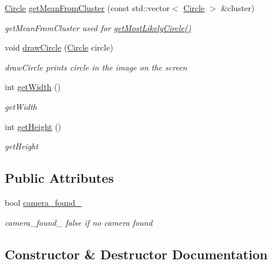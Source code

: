\begin{DoxyCompactItemize}
\hyperlink{struct_circle}{Circle} \hyperlink{class_find_ball_af7bd59a7915e09c1b6f004c89e2831c7}{get\+Mean\+From\+Cluster} (const std\+::vector$<$ \hyperlink{struct_circle}{Circle} $>$ \&cluster)
\begin{DoxyCompactList}\small\item\em get\+Mean\+From\+Cluster used for \hyperlink{class_find_ball_a11094b7b426f6c92281b3c86c04fe0ca}{get\+Most\+Likely\+Circle()} \end{DoxyCompactList}\item 
void \hyperlink{class_find_ball_ace38a252ba082f0e71fb71ad3519be6b}{draw\+Circle} (\hyperlink{struct_circle}{Circle} circle)
\begin{DoxyCompactList}\small\item\em draw\+Circle prints circle in the image on the screen \end{DoxyCompactList}\item 
int \hyperlink{class_find_ball_a1daa192fbb6dfd79d5ff6a05b5be737d}{get\+Width} ()
\begin{DoxyCompactList}\small\item\em get\+Width \end{DoxyCompactList}\item 
int \hyperlink{class_find_ball_acc373b957babcfb38dfafde6a7efd912}{get\+Height} ()
\begin{DoxyCompactList}\small\item\em get\+Height \end{DoxyCompactList}\end{DoxyCompactItemize}
\subsection*{Public Attributes}
\begin{DoxyCompactItemize}
\item 
bool \hyperlink{class_find_ball_a895af5160fff32eb4f9b7d803c246dc6}{camera\+\_\+found\+\_\+}
\begin{DoxyCompactList}\small\item\em camera\+\_\+found\+\_\+ false if no camera found \end{DoxyCompactList}\end{DoxyCompactItemize}


\subsection{Constructor \& Destructor Documentation}
\hypertarget{class_find_ball_a8e32037eac65317cf2a7e62374ec0906}{}

